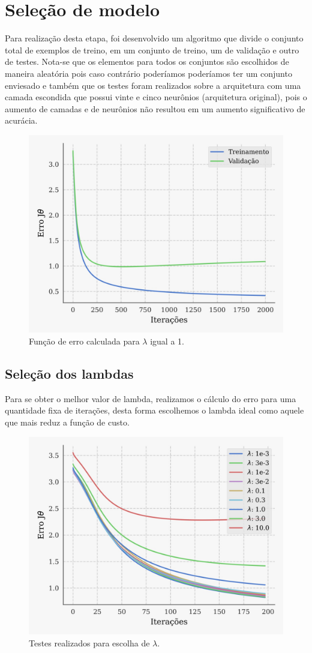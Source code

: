 \section{Seleção de modelo}
Para realização desta etapa, foi desenvolvido um algoritmo que divide o conjunto total de exemplos de treino, em um conjunto de treino, um de validação e outro de testes. Nota-se que os elementos para todos os conjuntos são escolhidos de maneira aleatória pois caso contrário poderíamos poderíamos ter um conjunto enviesado e também que os testes foram realizados sobre a arquitetura com uma camada escondida que possui vinte e cinco neurônios (arquitetura original), pois o aumento de camadas e de neurônios não resultou em um aumento significativo de acurácia.
\begin{figure}[htb]
    \centering
    \includegraphics[width=0.8\linewidth]{graficos/erro_lambda1.png}
    \caption{Função de erro calculada para $\lambda $ igual a 1.}
    \label{fig:custo1}
\end{figure}
\subsection{Seleção dos lambdas}
Para se obter o melhor valor de lambda, realizamos o cálculo do erro para uma quantidade fixa de iterações, desta forma escolhemos o lambda ideal como aquele que mais reduz a função de custo.
\begin{figure}[htb]
    \centering
    \includegraphics[width=0.60\linewidth]{graficos/teste_lambda.png}
    \caption{Testes realizados para escolha de $\lambda$.}
    \label{fig:lambda}
\end{figure}

